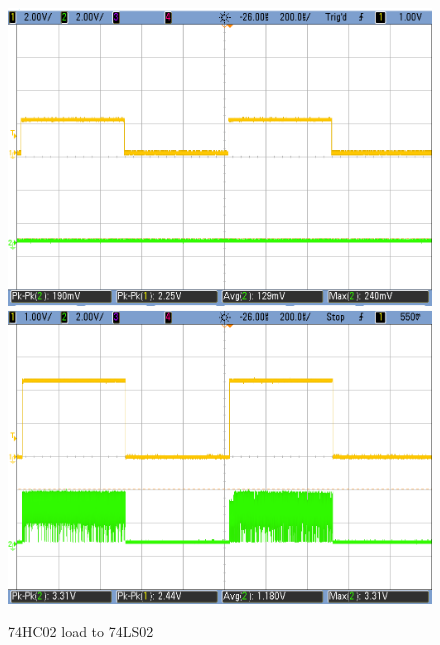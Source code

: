 \begin{figure}[h!]
		\vspace{0.2cm}
	   \includegraphics[scale=0.19]{HC-LS-2V.png}\hspace{1cm} 
        \includegraphics[scale=0.19]{HC-LS-2p3V.png}
        \caption{\color{cyan}74HC02 load to 74LS02}
        \label{fig:ej2exhctols}
    \end{figure}
    
